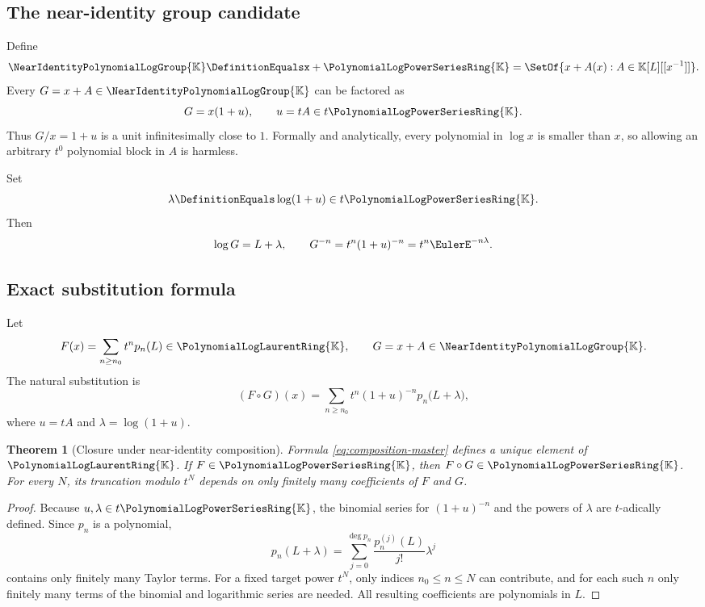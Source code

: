 \documentclass[11pt]{article}
\theoremstyle{pltheorem}
\newtheorem{theorem}{Theorem}[section]
\newcommand{\K}{\mathbb K}
\newcommand{\PL}{\PolynomialLogPowerSeriesRing{\K}}
\newcommand{\PLL}{\PolynomialLogLaurentRing{\K}}
\newcommand{\Gnear}{\NearIdentityPolynomialLogGroup{\K}}
\newcommand{\compose}{\mathbin{\circ}}
\begin{document}
\subsection{The near-identity group candidate}

Define
\begin{equation}\label{eq:Gnear-def}
 \Gnear\DefinitionEqualsx+\PL
 =\SetOf{x+A(x):A\in\K[L][[x^{-1}]]}.
\end{equation}
Every \(G=x+A\in\Gnear\) can be factored as
\begin{equation}\label{eq:G-factor}
 G=x(1+u),
 \qquad
 u=tA\in t\PL.
\end{equation}
Thus \(G/x=1+u\) is a unit infinitesimally close to \(1\).  Formally and analytically, every polynomial in \(\log x\) is smaller than \(x\), so allowing an arbitrary \(t^0\) polynomial block in \(A\) is harmless.

Set
\begin{equation}\label{eq:lambda-def}
 \lambda\DefinitionEquals\log(1+u)\in t\PL.
\end{equation}
Then
\begin{equation}\label{eq:logG-and-inverseG}
 \log G=L+\lambda,
 \qquad
 G^{-n}=t^n(1+u)^{-n}=t^n\EulerE^{-n\lambda}.
\end{equation}

\subsection{Exact substitution formula}

Let
\begin{equation}\label{eq:F-general-composition}
 F(x)=\sum_{n\ge n_0}t^np_n(L)\in\PLL,
 \qquad
 G=x+A\in\Gnear.
\end{equation}
The natural substitution is
\begin{equation}\label{eq:composition-master}
 (F\compose G)(x)
 =\sum_{n\ge n_0}t^n(1+u)^{-n}
 p_n\bigl(L+\lambda\bigr),
\end{equation}
where \(u=tA\) and \(\lambda=\log(1+u)\).

\begin{theorem}[Closure under near-identity composition]\label{thm:composition-closure}
Formula \cref{eq:composition-master} defines a unique element of \(\PLL\).  If \(F\in\PL\), then \(F\compose G\in\PL\).  For every \(N\), its truncation modulo \(t^N\) depends on only finitely many coefficients of \(F\) and \(G\).
\end{theorem}

\begin{proof}
Because \(u,\lambda\in t\PL\), the binomial series for \((1+u)^{-n}\) and the powers of \(\lambda\) are \(t\)-adically defined.  Since \(p_n\) is a polynomial,
\begin{equation}\label{eq:polynomial-shift}
 p_n(L+\lambda)
 =\sum_{j=0}^{\deg p_n}\frac{p_n^{(j)}(L)}{j!}\lambda^j
\end{equation}
contains only finitely many Taylor terms.  For a fixed target power \(t^N\), only indices \(n_0\le n\le N\) can contribute, and for each such \(n\) only finitely many terms of the binomial and logarithmic series are needed.  All resulting coefficients are polynomials in \(L\).
\end{proof}
\end{document}
